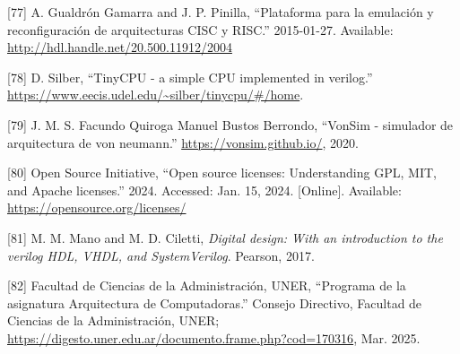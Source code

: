 \documentclass[12pt,oneside]{templates/unerthesis}
\newcommand{\CSLLeftMargin}[1]{#1} %
\newcommand{\CSLRightInline}[1]{#1} %
\newlength{\cslhangindent}
\newenvironment{CSLReferences}[2] %
 {\setlength{\parindent}{0pt}%
  \setlength{\leftskip}{#1 pt\relax}%
  \setlength{\parskip}{#2 pt\relax}%
  \everypar{\setlength{\hangindent}{\cslhangindent}}}
 {\par}
\begin{document}
\begin{CSLReferences}{0}{0}
\leavevmode{}%
\CSLLeftMargin{{[}77{]} }%
\CSLRightInline{A. Gualdrón Gamarra and J. P. Pinilla, {``Plataforma para la emulación y reconfiguración de arquitecturas CISC y RISC.''} 2015-01-27. Available: \url{http://hdl.handle.net/20.500.11912/2004}}

\leavevmode{}%
\CSLLeftMargin{{[}78{]} }%
\CSLRightInline{D. Silber, {``TinyCPU - a simple CPU implemented in verilog.''} \url{https://www.eecis.udel.edu/~silber/tinycpu/\#/home}.}

\leavevmode{}%
\CSLLeftMargin{{[}79{]} }%
\CSLRightInline{J. M. S. Facundo Quiroga Manuel Bustos Berrondo, {``VonSim - simulador de arquitectura de von neumann.''} \url{https://vonsim.github.io/}, 2020.}

\leavevmode{}%
\CSLLeftMargin{{[}80{]} }%
\CSLRightInline{Open Source Initiative, {``Open source licenses: Understanding {GPL}, {MIT}, and {Apache} licenses.''} 2024. Accessed: Jan. 15, 2024. {[}Online{]}. Available: \url{https://opensource.org/licenses/}}

\leavevmode{}%
\CSLLeftMargin{{[}81{]} }%
\CSLRightInline{M. M. Mano and M. D. Ciletti, \emph{Digital design: With an introduction to the verilog HDL, VHDL, and SystemVerilog}. Pearson, 2017.}

\leavevmode{}%
\CSLLeftMargin{{[}82{]} }%
\CSLRightInline{Facultad de Ciencias de la Administración, UNER, {``{Programa de la asignatura Arquitectura de Computadoras}.''} Consejo Directivo, Facultad de Ciencias de la Administración, UNER; \url{https://digesto.uner.edu.ar/documento.frame.php?cod=170316}, Mar. 2025.}

\end{CSLReferences}

%


\end{document}
